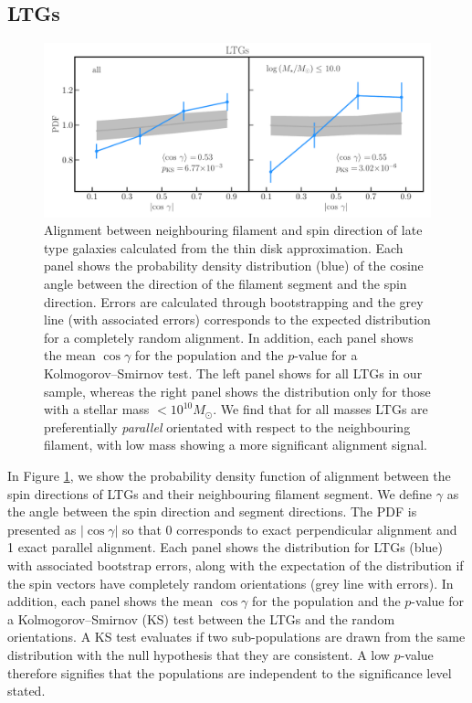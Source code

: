 \subsection{LTGs}
\begin{figure}
    \centering
    \includegraphics[width=\linewidth]{thesis/latex/cw_spin/spin_fil_LTGs_2in1.pdf}
    \caption{Alignment between neighbouring filament and spin direction of late type galaxies calculated from the thin disk approximation. Each panel shows the probability density distribution (blue) of the cosine angle between the direction of the filament segment and the spin direction. Errors are calculated through bootstrapping and the grey line (with associated errors) corresponds to the expected distribution for a completely random alignment. In addition, each panel shows the mean $\cos \gamma$ for the population and the $p$-value for a Kolmogorov--Smirnov test. The left panel shows for all LTGs in our sample, whereas the right panel shows the distribution only for those with a stellar mass $< 10^{10} M_{\odot}$. We find that for all masses LTGs are preferentially \textit{parallel} orientated with respect to the neighbouring filament, with low mass showing a more significant alignment signal.}
    \label{fig:ltgs_spin_alignment} 
\end{figure}

In Figure \ref{fig:ltgs_spin_alignment}, we show the probability density function of alignment between the spin directions of LTGs and their neighbouring filament segment. We define $\gamma$ as the angle between the spin direction and segment directions. The PDF is presented as $|\cos \gamma|$ so that 0 corresponds to exact perpendicular alignment and 1 exact parallel alignment. Each panel shows the distribution for LTGs (blue) with associated bootstrap errors, along with the expectation of the distribution if the spin vectors have completely random orientations (grey line with errors). In addition, each panel shows the mean $\cos \gamma$ for the population and the $p$-value for a Kolmogorov--Smirnov (KS) test between the LTGs and the random orientations. A KS test evaluates if two sub-populations are drawn from the same distribution with the null hypothesis that they are consistent. A low $p$-value therefore signifies that the populations are independent to the significance level stated. 

